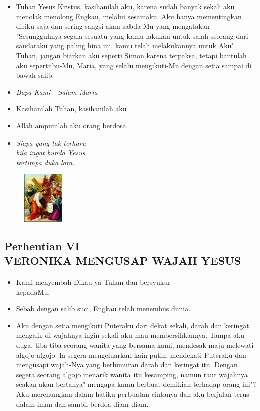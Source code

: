 \documentclass[a5paper,headsepline,titlepage,10pt,nnormalheadings,DIVcalc]{scrbook}
\newcommand{\BU}[1]{\begin{itemize} \item[U:] #1 \end{itemize}}
\newcommand{\BP}[1]{\begin{itemize} \item[P:] #1 \end{itemize}}
\begin{document}
\BU{ Tuhan Yesus  Kristus,  kasihanilah aku, karena sudah banyak sekali aku menolak menolong Engkau, melalui sesamaku. Aku hanya mementingkan diriku saja dan sering sangsi akan sabda-Mu yang mengatakan "Sesungguhnya segala sesuatu yang kamu lakukan untuk salah seorang dari saudaraku yang paling hina ini, kamu telah melakukannya untuk Aku". Tuhan, jangan biarkan aku seperti Simon karena terpaksa, tetapi bantulah aku sepertiibu-Mu, Maria, yang selalu mengikuti-Mu dengan setia sampai di bawah salib.}

\large\begin{itemize}\item[~]\it{Bapa Kami - Salam Maria}\end{itemize}\normalsize
\BP{Kasihanilah Tuhan, kasihanilah aku}
   \BU{Allah ampunilah aku orang berdosa.}

\begin{itemize}
\item[5.] \it{Siapa yang tak terharu\\ bila ingat bunda Yesus\\
    tertimpa duka lara.
}\end{itemize}

\begin{figure}
\includegraphics[width=2cm]{jalansalib_files/06_small.jpg}
\end{figure}
\subsection*{Perhentian VI\\
VERONIKA MENGUSAP WAJAH YESUS}

\BP{   Kami menyembah Dikau ya Tuhan dan bersyukur\\kepadaMu.}
\BU{   Sebab dengan salib suci, Engkau telah menembus dunia.}

\BP{Aku dengan setia mengikuti Puteraku dari dekat sekali, darah dan keringat mengalir di wajahnya ingin sekali aku mau membersihkannya. Tampa aku duga, tiba-tiba seorang wanita yang bersama kami, mendesak maju melewati algojo-algojo. Ia segera mengeluarkan kain putih, mendekati Puteraku dan mengusapi wajah-Nya yang berlumuran darah dan keringat itu. Dengan segera seorang algojo menarik wanita itu kesamping, namun raut wajahnya seakan-akan bertanya" mengapa kamu berbuat demikian terhadap orang ini"?Aku merenungkan dalam hatiku perbuatan cintanya dan aku berjalan terus dalam iman dan sambil berdoa diam-diam.}
\end{document}
